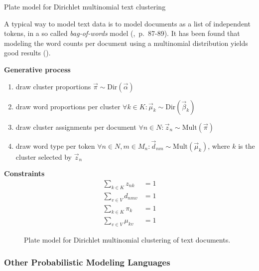 \begin{Example} Plate model for Dirichlet multinomial text clustering
\label{ex:clustering-pm}

A typical way to model text data is to model documents as a list of independent tokens, in a so called \emph{bag-of-words} model (\cite{murphy2012machine},~p.~87-89). It has been found that modeling the word counts per document using a multinomial distribution yields good results (\cite{mccallum1998comparison}).

\textbf{Generative process}
\begin{enumerate}
\item draw cluster proportions $\vec \pi \sim \text{Dir}(\vec \alpha)$
\item draw word proportions per cluster $\forall k \in K: \vec \mu_k \sim \text{Dir}(\vec \beta_k)$
\item draw cluster assignments per document $\forall n \in N: \vec z_n \sim \text{Mult}(\vec \pi)$
\item draw word type per token $\forall n \in N, m \in M_n: \vec d_{nm} \sim \text{Mult}(\vec \mu_k)$, where $k$ is the cluster selected by $\vec z_n$
\end{enumerate}

\textbf{Constraints}
\begin{align}
\sum_{k \in K} z_{nk} &= 1\\
\sum_{v \in V} d_{nmv} &= 1\\
\sum_{k \in K} \pi_{k} &= 1\\
\sum_{v \in V} \mu_{kv} &= 1
\end{align}

\begin{figure}[t]
	\begin{center}
    	\scalebox{\tikzScale}{\adjustTikzSize }
	\end{center}
\caption[Plate model for Dirichlet multinomial clustering of text documents]{Plate model for Dirichlet multinomial clustering of text documents.}
		\label{fig:clustering_platemodel}
\end{figure}

\end{Example}

\subsubsection{Other Probabilistic Modeling Languages}


